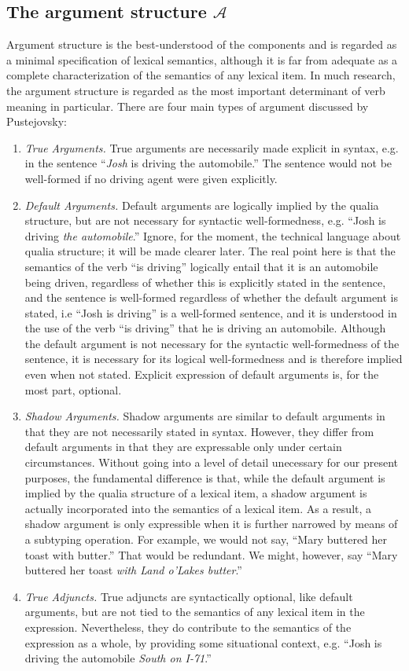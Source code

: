\documentclass[12pt]{amsart}
\begin{document}
\subsection{The argument structure $\mathcal{A}$}

Argument structure is the best-understood of the components and is regarded as a minimal specification of lexical semantics, although it is far from adequate as a complete characterization of the semantics of any lexical item. In much research, the argument structure is regarded as the most important determinant of verb meaning in particular. There are four main types of argument discussed by Pustejovsky:
\begin{enumerate}
\item \emph{True Arguments.} True arguments are necessarily made explicit in syntax, e.g. in the sentence ``\emph{Josh} is driving the automobile.'' The sentence would not be well-formed if no driving agent were given explicitly.
\item \emph{Default Arguments.} Default arguments are logically implied by the qualia structure, but are not necessary for syntactic well-formedness, e.g. ``Josh is driving \emph{the automobile}.'' Ignore, for the moment, the technical language about qualia structure; it will be made clearer later. The real point here is that the semantics of the verb ``is driving'' logically entail that it is an automobile being driven, regardless of whether this is explicitly stated in the sentence, and the sentence is well-formed regardless of whether the default argument is stated, i.e ``Josh is driving'' is a well-formed sentence, and it is understood in the use of the verb ``is driving'' that he is driving an automobile. Although the default argument is not necessary for the syntactic well-formedness of the sentence, it is necessary for its logical well-formedness and is therefore implied even when not stated. Explicit expression of default arguments is, for the most part, optional.
\item \emph{Shadow Arguments.} Shadow arguments are similar to default arguments in that they are not necessarily stated in syntax. However, they differ from default arguments in that they are expressable only under certain circumstances. Without going into a level of detail unecessary for our present purposes, the fundamental difference is that, while the default argument is implied by the qualia structure of a lexical item, a shadow argument is actually incorporated into the semantics of a lexical item. As a result, a shadow argument is only expressible when it is further narrowed by means of a subtyping operation. For example, we would not say, ``Mary buttered her toast with butter.'' That would be redundant. We might, however, say ``Mary buttered her toast \emph{with Land o'Lakes butter}.''
\item \emph{True Adjuncts.} True adjuncts are syntactically optional, like default arguments, but are not tied to the semantics of any lexical item in the expression. Nevertheless, they do contribute to the semantics of the expression as a whole, by providing some situational context, e.g. ``Josh is driving the automobile \emph{South on I-71}.''
\end{enumerate}
\end{document}
